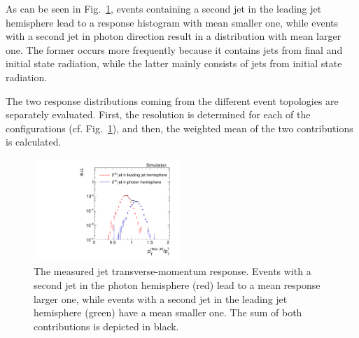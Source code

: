 As can be seen in Fig.~\ref{fig:fullResponseAndContributions}, events containing a second jet in the leading jet hemisphere lead to a response histogram with mean smaller one, while events with a second jet in photon direction result in a distribution with mean larger one. 
The former occurs more frequently because it contains jets from final and initial state radiation, while the latter mainly consists of jets from initial state radiation.

The two response distributions coming from the different event topologies are separately evaluated. First, the resolution is determined for each of the configurations 
(cf. Fig.~\ref{fig:fullResponseAndContributions}), and then, the weighted mean of the two contributions is calculated.\\
\begin{figure}[!t]
  \centering
      \includegraphics[width=0.49\textwidth]{figures/resolution/methodology/fullResponseAndContributions_6_alpha_bin.pdf}
  \caption{The measured jet transverse-momentum response. Events with a second jet in the photon hemisphere (red) lead to a mean response larger one, while events with a second jet in the leading jet hemisphere (green) have a mean smaller one. The sum of both contributions is depicted in black.}  
  \label{fig:fullResponseAndContributions}
\end{figure}



